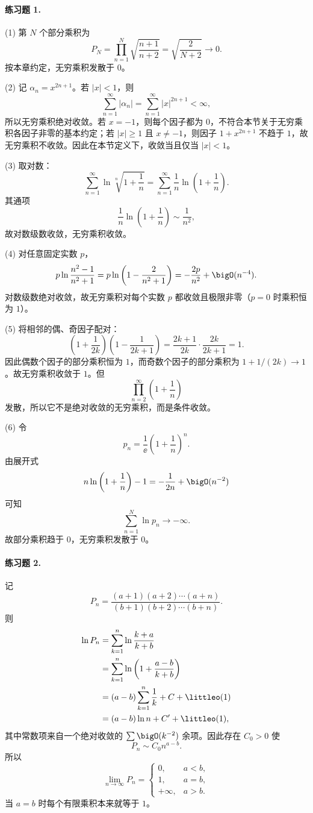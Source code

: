 \paragraph{练习题 1.}
\begin{xsolution}
(1) 第 $N$ 个部分乘积为
\[
 P_N=\prod_{n=1}^{N}\sqrt{\frac{n+1}{n+2}}
 =\sqrt{\frac2{N+2}}\longrightarrow0.
\]
按本章约定，无穷乘积发散于 $0$。

(2) 记 $\alpha_n=x^{2n+1}$。若 $|x|<1$，则
\[
 \sum_{n=1}^{\infty}|\alpha_n|
 =\sum_{n=1}^{\infty}|x|^{2n+1}<\infty,
\]
所以无穷乘积绝对收敛。若 $x=-1$，则每个因子都为 $0$，不符合本节关于无穷乘积各因子非零的基本约定；若 $|x|\geq1$ 且 $x\neq-1$，则因子 $1+x^{2n+1}$ 不趋于 $1$，故无穷乘积不收敛。因此在本节定义下，收敛当且仅当 $|x|<1$。

(3) 取对数：
\[
 \sum_{n=1}^{\infty}\ln\sqrt[n]{1+\frac1n}
 =\sum_{n=1}^{\infty}\frac1n\ln\left(1+\frac1n\right).
\]
其通项
\[
 \frac1n\ln\left(1+\frac1n\right)
 \sim\frac1{n^2},
\]
故对数级数收敛，无穷乘积收敛。

(4) 对任意固定实数 $p$，
\[
 p\ln\frac{n^2-1}{n^2+1}
 =p\ln\left(1-\frac2{n^2+1}\right)
 =-\frac{2p}{n^2}+\bigO(n^{-4}).
\]
对数级数绝对收敛，故无穷乘积对每个实数 $p$ 都收敛且极限非零（$p=0$ 时乘积恒为 $1$）。

(5) 将相邻的偶、奇因子配对：
\[
 \left(1+\frac1{2k}\right)
 \left(1-\frac1{2k+1}\right)
 =\frac{2k+1}{2k}\cdot\frac{2k}{2k+1}=1.
\]
因此偶数个因子的部分乘积恒为 $1$，而奇数个因子的部分乘积为 $1+1/(2k)\to1$。故无穷乘积收敛于 $1$。但
\[
 \prod_{n=2}^{\infty}\left(1+\frac1n\right)
\]
发散，所以它不是绝对收敛的无穷乘积，而是条件收敛。

(6) 令
\[
 p_n=\frac1\ee\left(1+\frac1n\right)^n.
\]
由展开式
\[
 n\ln\left(1+\frac1n\right)-1
 =-\frac1{2n}+\bigO(n^{-2})
\]
可知
\[
 \sum_{n=1}^{N}\ln p_n\longrightarrow-\infty.
\]
故部分乘积趋于 $0$，无穷乘积发散于 $0$。
\end{xsolution}

\paragraph{练习题 2.}
\begin{xsolution}
记
\[
 P_n=\frac{(a+1)(a+2)\cdots(a+n)}{(b+1)(b+2)\cdots(b+n)}.
\]
则
\[
 \begin{aligned}
 \ln P_n
 &=\sum_{k=1}^{n}\ln\frac{k+a}{k+b}\\
 &=\sum_{k=1}^{n}\ln\left(1+\frac{a-b}{k+b}\right)\\
 &=(a-b)\sum_{k=1}^{n}\frac1k+C+\littleo(1)\\
 &=(a-b)\ln n+C'+\littleo(1),
 \end{aligned}
\]
其中常数项来自一个绝对收敛的 $\sum\bigO(k^{-2})$ 余项。因此存在 $C_0>0$ 使
\[
 P_n\sim C_0n^{a-b}.
\]
所以
\[
 \boxed{
 \lim_{n\to\infty}P_n=
 \begin{cases}
 0,&a<b,\\
 1,&a=b,\\
 +\infty,&a>b.
 \end{cases}}
\]
当 $a=b$ 时每个有限乘积本来就等于 $1$。
\end{xsolution}

